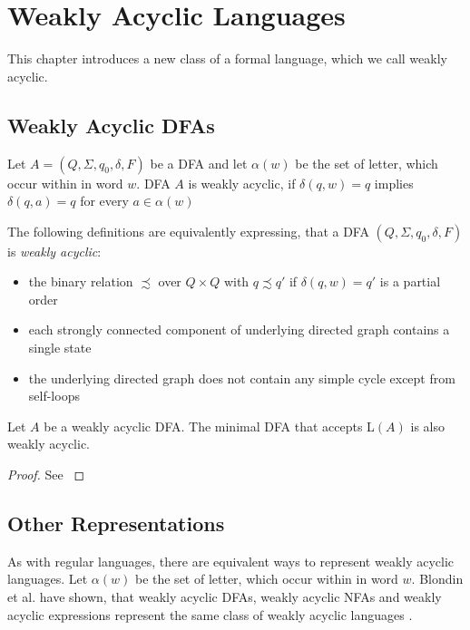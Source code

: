 \chapter{Weakly Acyclic Languages}\label{chapter:weakly_acyclic_language}

This chapter introduces a new class of a formal language, which we call weakly acyclic. 

\section{Weakly Acyclic DFAs}\label{sec:weakly_acyclic_dfa}

\begin{definition}
Let $A = (Q, \Sigma, q_{0},\delta,F)$ be a DFA and let $\alpha(w)$ be the set of letter, which occur within in word $w$. DFA $A$ is weakly acyclic, if $\delta(q,w) = q$ implies $\delta(q,a) = q$ for every $a \in \alpha(w)$
\end{definition}

The following definitions are equivalently expressing, that a DFA $(Q, \Sigma, q_{0},\delta,F)$ is \textit{weakly acyclic}:
\begin{itemize}[--,noitemsep]
	\item the binary relation $\precsim $  over $Q \times Q$ with $q \precsim q'$ if $\delta(q,w) = q'$ is a partial order
	\item each strongly connected component of underlying directed graph contains a single state 
	\item the underlying directed graph does not contain any simple cycle except from self-loops
\end{itemize}


\begin{lemma}\label{lem:minimal}
Let $A$ be a weakly acyclic DFA. The minimal DFA that accepts L$(A)$ is also weakly acyclic. 
\end{lemma}

\begin{proof}
See {\cite[Proposition~4]{blondin_24}}
\end{proof}


\section{Other Representations}

As with regular languages, there are equivalent ways to represent weakly acyclic languages. Let $\alpha(w)$ be the set of letter, which occur within in word $w$. 
Blondin et al. have shown, that weakly acyclic DFAs, weakly acyclic NFAs and weakly acyclic expressions represent the same class of weakly acyclic languages \cite{blondin_24}. 


